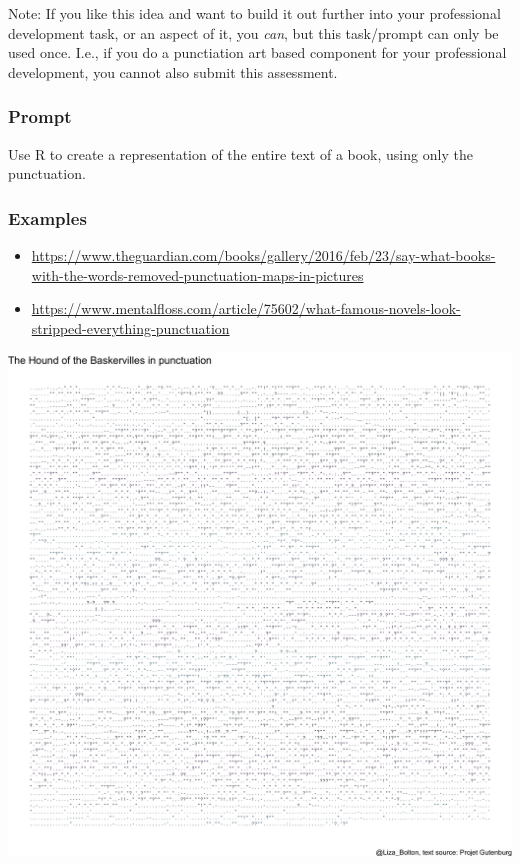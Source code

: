 \documentclass[
  openany]{book}
\providecommand{\tightlist}{%
  \setlength{\itemsep}{0pt}\setlength{\parskip}{0pt}}
\begin{document}
Note: If you like this idea and want to build it out further into your professional development task, or an aspect of it, you \emph{can}, but this task/prompt can only be used once. I.e., if you do a punctiation art based component for your professional development, you cannot also submit this assessment.

\hypertarget{prompt-2}{%
\subsubsection{Prompt}\label{prompt-2}}

Use R to create a representation of the entire text of a book, using only the punctuation.

\hypertarget{examples-6}{%
\subsubsection{Examples}\label{examples-6}}

\begin{itemize}
\tightlist
\item
  \url{https://www.theguardian.com/books/gallery/2016/feb/23/say-what-books-with-the-words-removed-punctuation-maps-in-pictures}
\item
  \url{https://www.mentalfloss.com/article/75602/what-famous-novels-look-stripped-everything-punctuation}
\end{itemize}

\begin{center}\includegraphics[width=1\linewidth]{images/assessments/hound_of_the_baskervilles} \end{center}
\end{document}
